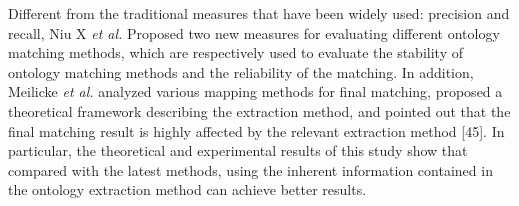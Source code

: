 \documentclass[twoside]{article}
\begin{document}
\begin{multicols}{2}

Different from the traditional measures that have been widely used: precision and recall, Niu X {\it et al.} Proposed two new measures for evaluating different ontology matching methods, which are respectively used to evaluate the stability of ontology matching methods and the reliability of the matching\cite{wwy44}.
In addition, Meilicke {\it et al.} analyzed various mapping methods for final matching, proposed a theoretical framework describing the extraction method, and pointed out that the final matching result is highly affected by the relevant extraction method [45]. In particular, the theoretical and experimental results of this study show that compared with the latest methods, using the inherent information contained in the ontology extraction method can achieve better results.


\end{multicols}
\end{document}
